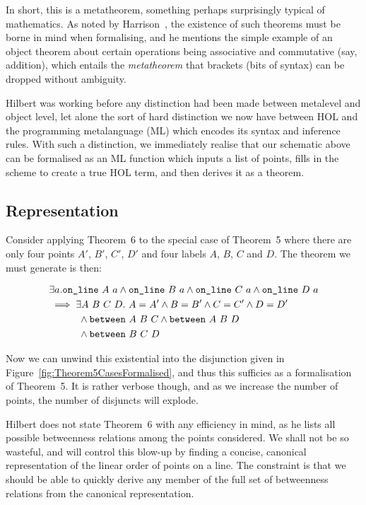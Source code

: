 In short, this is a metatheorem, something perhaps surprisingly typical of mathematics. As noted by Harrison~\cite{FormalizedMathematics}, the existence of such theorems must be borne in mind when formalising, and he mentions the simple example of an object theorem about certain operations being associative and commutative (say, addition), which entails the \emph{metatheorem} that brackets (bits of syntax) can be dropped without ambiguity.

Hilbert was working before any distinction had been made between metalevel and object level, let alone the sort of hard distinction we now have between HOL and the programming metalanguage (ML) which encodes its syntax and inference rules. With such a distinction, we immediately realise that our schematic above can be formalised as an ML function which inputs a list of points, fills in the scheme to create a true HOL term, and then derives it as a theorem.

\subsection{Representation}
Consider applying Theorem~6 to the special case of Theorem~5 where there are only four points $A'$, $B'$, $C'$, $D'$ and four labels $A$, $B$, $C$ and $D$. The theorem we must generate is then:

\begin{equation}
  \begin{split}
    &\exists a. \code{on\_line}\ A\ a\wedge\code{on\_line}\ B\ a\wedge\code{on\_line}\ C\ a\wedge\code{on\_line}\ D\ a\\
    &\implies\exists A\ B\ C\ D.\ A = A' \wedge B = B' \wedge C = C' \wedge D = D'\\
    &\qquad\quad\wedge\between{A}{B}{C} \wedge \between{A}{B}{D}\\
    &\qquad\quad\wedge\between{B}{C}{D}
  \end{split}
\end{equation} 

Now we can unwind this existential into the disjunction given in Figure~\ref{fig:Theorem5CasesFormalised}, and thus this sufficies as a formalisation of Theorem~5. It is rather verbose though, and as we increase the number of points, the number of disjuncts will explode. 

Hilbert does not state Theorem~6 with any efficiency in mind, as he lists all possible betweenness relations among the points considered. We shall not be so wasteful, and will control this blow-up by finding a concise, canonical representation of the linear order of points on a line. The constraint is that we should be able to quickly derive any member of the full set of betweenness relations from the canonical representation.

